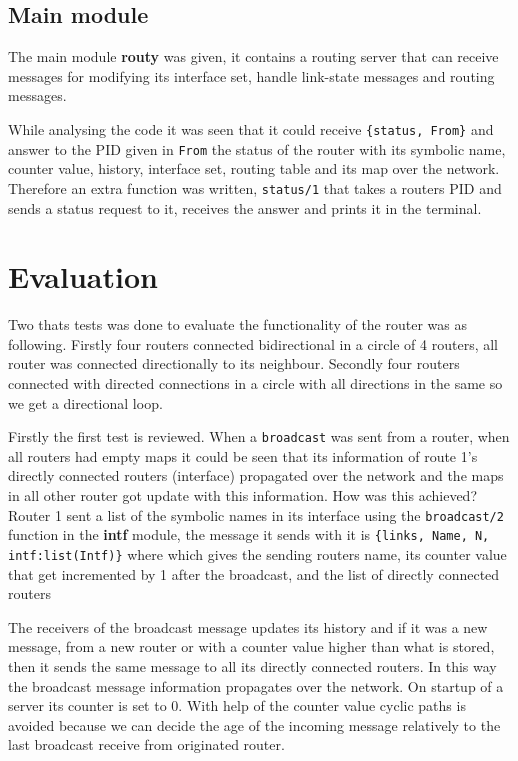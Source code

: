 \documentclass[a4paper, 11pt]{article}
\begin{document}
\subsection{Main module}

The main module \textbf{routy} was given, it contains a routing server that can receive messages for modifying its interface set, handle link-state messages and routing messages.

While analysing the code it was seen that it could receive \verb!{status, From}! and answer to the PID given in \verb!From! the status of the router with its symbolic name, counter value, history, interface set, routing table and its map over the network. Therefore an extra function was written, \verb!status/1! that takes a routers PID and sends a status request to it, receives the answer and prints it in the terminal.

\section{Evaluation}

Two thats tests was done to evaluate the functionality of the router was as following. Firstly four routers connected bidirectional in a circle of 4 routers, all router was connected directionally to its neighbour. Secondly four routers connected with directed connections in a circle with all directions in the same so we get a directional loop.

Firstly the first test is reviewed. When a \verb!broadcast! was sent from a router, when all routers had empty maps it could be seen that its information of route 1's directly connected routers (interface) propagated over the network and the maps in all other router got update with this information. How was this achieved? Router 1 sent a list of the symbolic names in its interface using the \verb!broadcast/2! function in the \textbf{intf} module, the message it sends with it is \verb!{links, Name, N, intf:list(Intf)}! where which gives the sending routers name, its counter value that get incremented by 1 after the broadcast, and the list of directly connected routers

The receivers of the broadcast message updates its history and if it was a new message, from a new router or with a counter value higher than what is stored, then it sends the same message to all its directly connected routers. In this way the broadcast message information propagates over the network. On startup of a server its counter is set to 0. With help of the counter value cyclic paths is avoided because we can decide the age of the incoming message relatively to the last broadcast receive from originated router.
\end{document}
